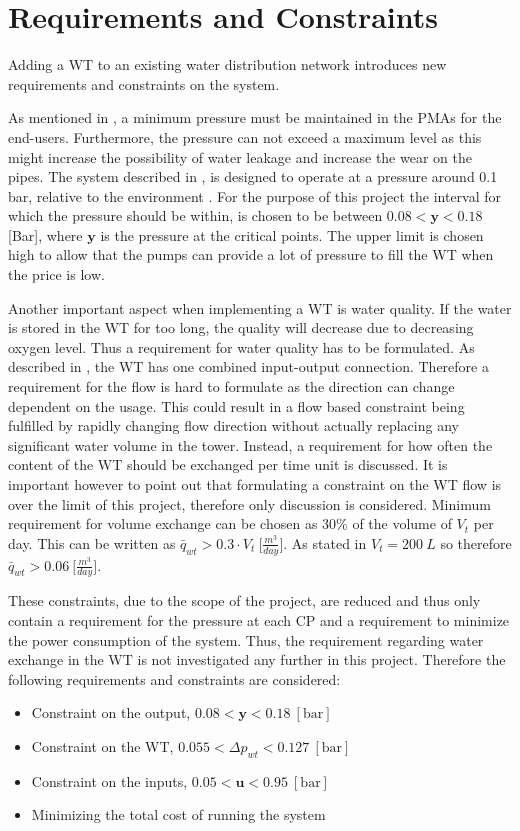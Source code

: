 \chapter{Requirements and Constraints}
\label{Requirements_and_constraints}

Adding a WT to an existing water distribution network introduces new requirements and constraints on the system. 

As mentioned in , a minimum pressure must be maintained in the PMAs for the end-users. Furthermore, the pressure can not exceed a maximum level as this might increase the possibility of water leakage and increase the wear on the pipes. The system described in , is designed to operate at a pressure around 0.1 bar, relative to the environment \cite{master_aau}. For the purpose of this project the interval for which the pressure should be within, is chosen to be between $0.08 < \bm{y} < 0.18$ [Bar], where $\bm{y}$ is the pressure at the critical points. The upper limit is chosen high to allow that the pumps can provide a lot of pressure to fill the WT when the price is low. 

Another important aspect when implementing a WT is water quality. If the water is stored in the WT for too long, the quality will decrease due to decreasing oxygen level. Thus a requirement for water quality has to be formulated. As described in , the WT has one combined input-output connection. Therefore a requirement for the flow is hard to formulate as the direction can change dependent on the usage. This could result in a flow based constraint being fulfilled by rapidly changing flow direction without actually replacing any significant water volume in the tower. Instead, a requirement for how often the content of the WT should be exchanged per time unit is discussed. It is important however to point out that formulating a constraint on the WT flow is over the limit of this project, therefore only discussion is considered. 
Minimum requirement for volume exchange can be chosen as 30\% of the volume of $V_t$ per day. This can be written as $\bar{q}_{wt} > 0.3\cdot V_t \: \big[\frac{m^3}{day}\big]$. As stated in  $V_t = 200 \:L$ so therefore $\bar{q}_{wt} > 0.06 \: \big[\frac{m^3}{day}\big]$.

These constraints, due to the scope of the project, are reduced and thus only contain a requirement for the pressure at each CP and a requirement to minimize the power consumption of the system. Thus, the requirement regarding water exchange in the WT is not investigated any further in this project. 
Therefore the following requirements and constraints are considered:

\begin{itemize}
	\item Constraint on the output, $0.08 < \bm{y} < 0.18 \:[\text{bar}]$
%
	\item Constraint on the WT, $0.055 < \Delta p_{wt} < 0.127  \:[\text{bar}]$
%
	\item Constraint on the inputs, $ 0.05 < \bm{u} < 0.95  \:[\text{bar}]$
%
	\item Minimizing the total cost of running the system
\end{itemize}
 